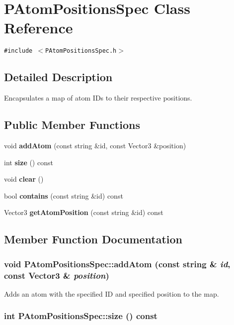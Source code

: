 \section{PAtom\-Positions\-Spec Class Reference}
\label{classPAtomPositionsSpec}
{\tt \#include $<$PAtom\-Positions\-Spec.h$>$}



\subsection{Detailed Description}
Encapsulates a map of atom IDs to their respective positions. 

\subsection*{Public Member Functions}
\begin{CompactItemize}
\item 
void {\bf add\-Atom} (const string \&id, const Vector3 \&position)
\item 
int {\bf size} () const
\item 
void {\bf clear} ()
\item 
bool {\bf contains} (const string \&id) const 
\item 
Vector3 {\bf get\-Atom\-Position} (const string \&id) const 
\end{CompactItemize}


\subsection{Member Function Documentation}
\subsubsection{\setlength{\rightskip}{0pt plus 5cm}void PAtom\-Positions\-Spec::add\-Atom (const string \& {\em id}, const Vector3 \& {\em position})}\label{classPAtomPositionsSpec_69b5fccc1824f83625481318c4b0d743}


Adds an atom with the specified ID and specified position to the map. 
\subsubsection{\setlength{\rightskip}{0pt plus 5cm}int PAtom\-Positions\-Spec::size () const\hspace{0.3cm}{\tt  [inline]}}\label{classPAtomPositionsSpec_9e672230f2968858dc941782b6588f9d}


